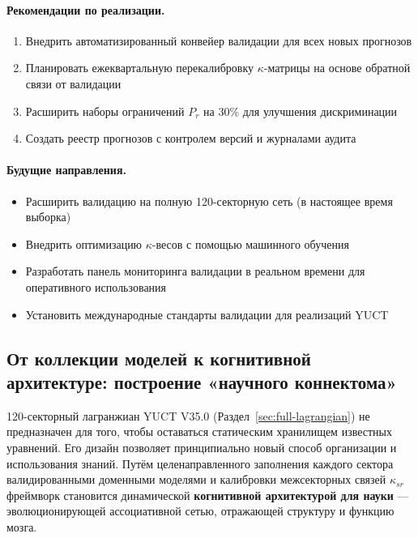 \documentclass[11pt,a4paper]{article}
\begin{document}
	\paragraph{Рекомендации по реализации.}
	\begin{enumerate}[leftmargin=*]
		\item Внедрить автоматизированный конвейер валидации для всех новых прогнозов
		\item Планировать ежеквартальную перекалибровку $\kappa$-матрицы на основе обратной связи от валидации
		\item Расширить наборы ограничений $P_r$ на 30\% для улучшения дискриминации
		\item Создать реестр прогнозов с контролем версий и журналами аудита
	\end{enumerate}
	
	\paragraph{Будущие направления.}
	\begin{itemize}
		\item Расширить валидацию на полную 120-секторную сеть (в настоящее время выборка)
		\item Внедрить оптимизацию $\kappa$-весов с помощью машинного обучения
		\item Разработать панель мониторинга валидации в реальном времени для оперативного использования
		\item Установить международные стандарты валидации для реализаций YUCT
	\end{itemize}
	
	\subsection{От коллекции моделей к когнитивной архитектуре: построение «научного коннектома»}
	\label{subsec:cognitive-architecture}
	
	120-секторный лагранжиан YUCT V35.0 (Раздел~\ref{sec:full-lagrangian}) не предназначен для того, чтобы оставаться статическим хранилищем известных уравнений. Его дизайн позволяет принципиально новый способ организации и использования знаний. Путём целенаправленного заполнения каждого сектора валидированными доменными моделями и калибровки межсекторных связей \(\kappa_{sr}\) фреймворк становится динамической \textbf{когнитивной архитектурой для науки} — эволюционирующей ассоциативной сетью, отражающей структуру и функцию мозга.
	
\end{document}
